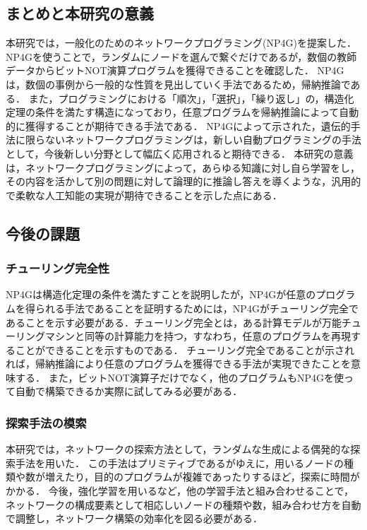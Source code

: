 \documentclass[exploratorypaper]{jsaiart} %
\begin{document}
\subsection{まとめと本研究の意義}
本研究では，一般化のためのネットワークプログラミング(NP4G)を提案した．NP4Gを使うことで，ランダムにノードを選んで繋ぐだけであるが，数個の教師データからビットNOT演算プログラムを獲得できることを確認した．
NP4Gは，数個の事例から一般的な性質を見出していく手法であるため，帰納推論である．
また，プログラミングにおける「順次」，「選択」，「繰り返し」の，構造化定理の条件を満たす構造になっており，任意プログラムを帰納推論によって自動的に獲得することが期待できる手法である．
NP4Gによって示された，遺伝的手法に限らないネットワークプログラミングは，新しい自動プログラミングの手法として，今後新しい分野として幅広く応用されると期待できる．
本研究の意義は，ネットワークプログラミングによって，あらゆる知識に対し自ら学習をし，その内容を活かして別の問題に対して論理的に推論し答えを導くような，汎用的で柔軟な人工知能の実現が期待できることを示した点にある．

\subsection{今後の課題}
\subsubsection{チューリング完全性}
NP4Gは構造化定理の条件を満たすことを説明したが，NP4Gが任意のプログラムを得られる手法であることを証明するためには，NP4Gがチューリング完全であることを示す必要がある．チューリング完全とは，ある計算モデルが万能チューリングマシンと同等の計算能力を持つ，すなわち，任意のプログラムを再現することができることを示すものである．
チューリング完全であることが示されれば，帰納推論により任意のプログラムを獲得できる手法が実現できたことを意味する．
また，ビットNOT演算子だけでなく，他のプログラムもNP4Gを使って自動で構築できるか実際に試してみる必要がある．
\subsubsection{探索手法の模索}
本研究では，ネットワークの探索方法として，ランダムな生成による偶発的な探索手法を用いた．
この手法はプリミティブであるがゆえに，用いるノードの種類や数が増えたり，目的のプログラムが複雑であったりするほど，探索に時間がかかる．
今後，強化学習を用いるなど，他の学習手法と組み合わせることで，ネットワークの構成要素として相応しいノードの種類や数，組み合わせ方を自動で調整し，ネットワーク構築の効率化を図る必要がある．
\end{document}
